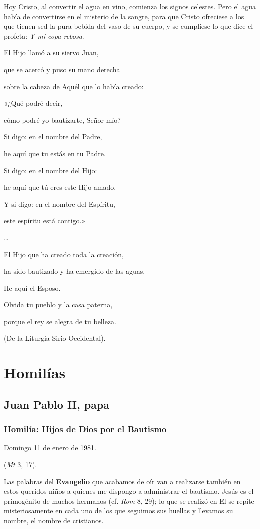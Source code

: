 {Hoy Cristo, al convertir el agua en vino, comienza los signos celestes. Pero el agua había de convertirse en el misterio de la sangre, para que Cristo ofreciese a los que tienen sed la pura bebida del vaso de su cuerpo, y se cumpliese lo que dice el profeta: \emph{Y mi copa rebosa}.

El Hijo llamó a su siervo Juan,

que se acercó y puso su mano derecha

sobre la cabeza de Aquél que lo había creado:

«¿Qué podré decir,

cómo podré yo bautizarte, Señor mío?

Si digo: en el nombre del Padre,

he aquí que tu estás en tu Padre.

Si digo: en el nombre del Hijo:

he aquí que tú eres este Hijo amado.

Y si digo: en el nombre del Espíritu,

este espíritu está contigo.»

\ldots{}

El Hijo que ha creado toda la creación,

ha sido bautizado y ha emergido de las aguas.

He aquí el Esposo.

Olvida tu pueblo y la casa paterna,

porque el rey se alegra de tu belleza.

(De la Liturgia Sirio-Occidental).


\section{Homilías}

\subsection{Juan Pablo II, papa}

\subsubsection{Homilía: Hijos de Dios por el Bautismo}

Domingo 11 de enero de 1981.

 (\emph{Mt} 3, 17).

Las palabras del \textbf{Evangelio} que acabamos de oír van a realizarse también en estos queridos niños a quienes me dispongo a administrar el bautismo. Jesús es el primogénito de muchos hermanos (cf. \emph{Rom} 8, 29); lo que se realizó en El se repite misteriosamente en cada uno de los que seguimos sus huellas y llevamos su nombre, el nombre de cristianos.

}
